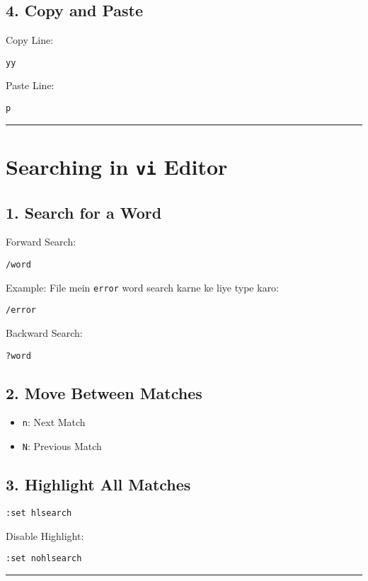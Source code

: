 \documentclass[a4paper,12pt]{article}
\begin{document}
\subsection*{4. Copy and Paste}
Copy Line:
\begin{lstlisting}
yy
\end{lstlisting}
Paste Line:
\begin{lstlisting}
p
\end{lstlisting}

\hrule

\section*{Searching in \texttt{vi} Editor}
\subsection*{1. Search for a Word}
Forward Search:
\begin{lstlisting}
/word
\end{lstlisting}
Example: File mein \texttt{error} word search karne ke liye type karo:
\begin{lstlisting}
/error
\end{lstlisting}
Backward Search:
\begin{lstlisting}
?word
\end{lstlisting}

\subsection*{2. Move Between Matches}
\begin{itemize}
    \item \texttt{n}: Next Match
    \item \texttt{N}: Previous Match
\end{itemize}

\subsection*{3. Highlight All Matches}
\begin{lstlisting}
:set hlsearch
\end{lstlisting}
Disable Highlight:
\begin{lstlisting}
:set nohlsearch
\end{lstlisting}

\hrule
\end{document}
